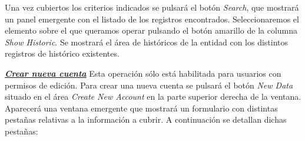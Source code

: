 Una vez cubiertos los criterios indicados se pulsará el botón \emph{Search}, que mostrará un panel emergente con el listado de los registros encontrados. Seleccionaremos el elemento sobre el que queramos operar pulsando el botón amarillo de la columna \emph{Show Historic}. Se mostrará el área de históricos de la entidad con los distintos registros de histórico existentes.


\underline{\textsl{\textbf{Crear nueva cuenta}}}\newline
Esta operación sólo está habilitada para usuarios con permisos de edición.
Para crear una nueva cuenta se pulsará el botón \textit{New Data} situado en el área \emph{Create New Account} en la parte superior derecha de la ventana. Aparecerá una ventana emergente que mostrará un formulario con distintas pestañas relativas a la información a cubrir. A continuación se detallan dichas pestañas:

